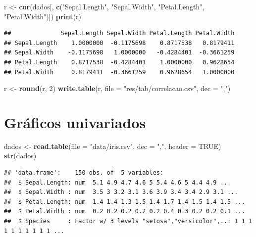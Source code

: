\documentclass[
]{book}
\newenvironment{Shaded}{\begin{snugshade}}{\end{snugshade}}
\newcommand{\DataTypeTok}[1]{\textcolor[rgb]{0.13,0.29,0.53}{#1}}
\newcommand{\DecValTok}[1]{\textcolor[rgb]{0.00,0.00,0.81}{#1}}
\newcommand{\KeywordTok}[1]{\textcolor[rgb]{0.13,0.29,0.53}{\textbf{#1}}}
\newcommand{\NormalTok}[1]{#1}
\newcommand{\OtherTok}[1]{\textcolor[rgb]{0.56,0.35,0.01}{#1}}
\newcommand{\StringTok}[1]{\textcolor[rgb]{0.31,0.60,0.02}{#1}}
\begin{document}
\begin{Shaded}
\begin{Highlighting}[]
\NormalTok{r <-}\StringTok{ }\KeywordTok{cor}\NormalTok{(dados[, }\KeywordTok{c}\NormalTok{(}\StringTok{"Sepal.Length"}\NormalTok{, }\StringTok{"Sepal.Width"}\NormalTok{, }\StringTok{"Petal.Length"}\NormalTok{, }\StringTok{"Petal.Width"}\NormalTok{)])}
\KeywordTok{print}\NormalTok{(r)}
\end{Highlighting}
\end{Shaded}

\begin{verbatim}
##              Sepal.Length Sepal.Width Petal.Length Petal.Width
## Sepal.Length    1.0000000  -0.1175698    0.8717538   0.8179411
## Sepal.Width    -0.1175698   1.0000000   -0.4284401  -0.3661259
## Petal.Length    0.8717538  -0.4284401    1.0000000   0.9628654
## Petal.Width     0.8179411  -0.3661259    0.9628654   1.0000000
\end{verbatim}

\begin{Shaded}
\begin{Highlighting}[]
\NormalTok{r <-}\StringTok{ }\KeywordTok{round}\NormalTok{(r, }\DecValTok{2}\NormalTok{)}
\KeywordTok{write.table}\NormalTok{(r, }\DataTypeTok{file =} \StringTok{"res/tab/correlacao.csv"}\NormalTok{, }\DataTypeTok{dec =} \StringTok{","}\NormalTok{)}
\end{Highlighting}
\end{Shaded}

\hypertarget{gruxe1ficos-univariados}{%
\chapter{Gráficos univariados}\label{gruxe1ficos-univariados}}

\begin{Shaded}
\begin{Highlighting}[]
\NormalTok{dados <-}\StringTok{ }\KeywordTok{read.table}\NormalTok{(}\DataTypeTok{file =} \StringTok{"data/iris.csv"}\NormalTok{, }\DataTypeTok{dec =} \StringTok{","}\NormalTok{, }\DataTypeTok{header =} \OtherTok{TRUE}\NormalTok{)}
\KeywordTok{str}\NormalTok{(dados)}
\end{Highlighting}
\end{Shaded}

\begin{verbatim}
## 'data.frame':    150 obs. of  5 variables:
##  $ Sepal.Length: num  5.1 4.9 4.7 4.6 5 5.4 4.6 5 4.4 4.9 ...
##  $ Sepal.Width : num  3.5 3 3.2 3.1 3.6 3.9 3.4 3.4 2.9 3.1 ...
##  $ Petal.Length: num  1.4 1.4 1.3 1.5 1.4 1.7 1.4 1.5 1.4 1.5 ...
##  $ Petal.Width : num  0.2 0.2 0.2 0.2 0.2 0.4 0.3 0.2 0.2 0.1 ...
##  $ Species     : Factor w/ 3 levels "setosa","versicolor",..: 1 1 1 1 1 1 1 1 1 1 ...
\end{verbatim}
\end{document}
